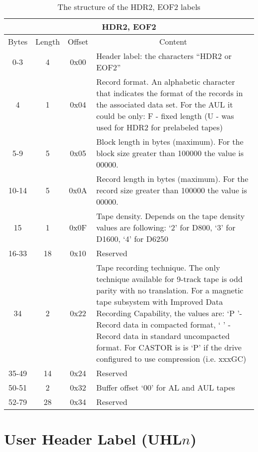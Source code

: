 \begin{table}[ht]
\caption{The structure of the HDR2, EOF2 labels}
\label{tab:hdr2_eof2_labels}
\begin{center}
\begin{tabularx}{\textwidth}{ |c|c|c|X| }
  \hline
  \multicolumn{4}{|c|}{HDR2, EOF2} \\
  \hline
  Bytes & Length & Offset & \multicolumn{1}{c|}{Content} \\
  \hline \hline
  0-3 & 4 & 0x00 & Header label: the characters ``HDR2 or EOF2'' \\
  \hline
  4 & 1 & 0x04 & Record format. An alphabetic character that indicates the
  format of the records in the associated data set. For the AUL it could be only: F - fixed length 
  (U - was used for HDR2 for prelabeled tapes)\\
  \hline
  5-9 & 5 & 0x05 & Block length in bytes (maximum).  For the block size  greater than 100000 the value is 00000. \\
  \hline
  10-14 & 5 & 0x0A & Record length in bytes (maximum). For the record size greater than 100000 the value is 00000. \\
  \hline
  15 & 1 & 0x0F & Tape density. Depends on the tape density values are following: `2' for D800, `3' for D1600, `4' for D6250  \\
  \hline
  16-33 & 18 & 0x10 & Reserved \\
  \hline
  34 & 2 & 0x22 & Tape recording technique. The only technique available for 9-track tape is odd parity with no translation.
  For a magnetic tape subsystem with Improved Data Recording Capability, the values are: `P '- Record data in compacted format, 
`  ' - Record data in standard uncompacted format. For CASTOR is is `P' if the drive configured to use compression (i.e. xxxGC) \\
  \hline
  35-49 & 14 & 0x24 & Reserved \\
  \hline
  50-51 & 2 & 0x32 & Buffer offset `00' for AL and AUL tapes \\
  \hline
  52-79 & 28 & 0x34 & Reserved \\
  \hline
\end{tabularx}
\end{center}
\end{table}

\section{User Header Label (UHL$n$)}

